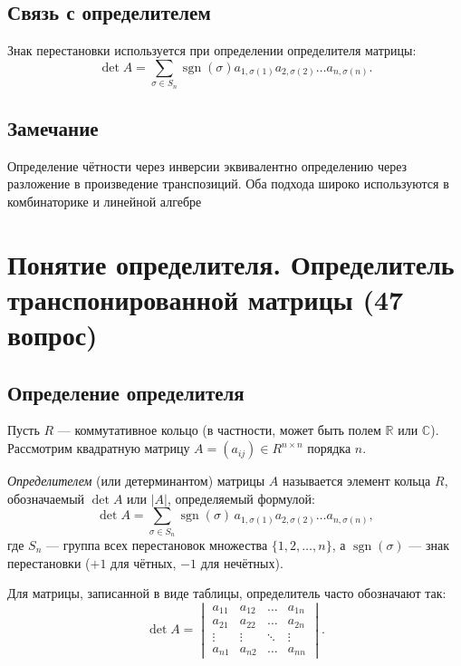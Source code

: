 \documentclass[a4paper,12pt]{article}
\theoremstyle{definition}
\theoremstyle{plain}
\theoremstyle{remark}
\begin{document}
	\subsection{Связь с определителем}
	
	Знак перестановки используется при определении определителя матрицы:
	\[
	\det A = \sum_{\sigma \in S_n} \operatorname{sgn}(\sigma) a_{1,\sigma(1)} a_{2,\sigma(2)} \dots a_{n,\sigma(n)}.
	\]
	
	\subsection{Замечание}
	
	Определение чётности через инверсии эквивалентно определению через разложение в произведение транспозиций. Оба подхода широко используются в комбинаторике и линейной алгебре
	
	
	
	
	\newpage
	\section{Понятие определителя. Определитель транспонированной матрицы (47 вопрос)}
	
	\subsection{Определение определителя}
	
	Пусть \( R \) — коммутативное кольцо (в частности, может быть полем \( \mathbb{R} \) или \( \mathbb{C} \)). Рассмотрим квадратную матрицу \( A = (a_{ij}) \in R^{n \times n} \) порядка \( n \).
	
	\begin{tcolorbox}[colback=blue!5, colframe=blue!40!black, title=Определение]
		\textit{Определителем} (или детерминантом) матрицы \( A \) называется элемент кольца \( R \), обозначаемый \( \det A \) или \( |A| \), определяемый формулой:
		\[
		\det A = \sum_{\sigma \in S_n} \operatorname{sgn}(\sigma) \, a_{1,\sigma(1)} a_{2,\sigma(2)} \dots a_{n,\sigma(n)},
		\]
		где \( S_n \) — группа всех перестановок множества \( \{1, 2, \dots, n\} \), а \( \operatorname{sgn}(\sigma) \) — знак перестановки (\( +1 \) для чётных, \( -1 \) для нечётных).
	\end{tcolorbox}
	
	Для матрицы, записанной в виде таблицы, определитель часто обозначают так:
	\[
	\det A = \begin{vmatrix}
		a_{11} & a_{12} & \dots & a_{1n} \\
		a_{21} & a_{22} & \dots & a_{2n} \\
		\vdots & \vdots & \ddots & \vdots \\
		a_{n1} & a_{n2} & \dots & a_{nn}
	\end{vmatrix}.
	\]
	
\end{document}
